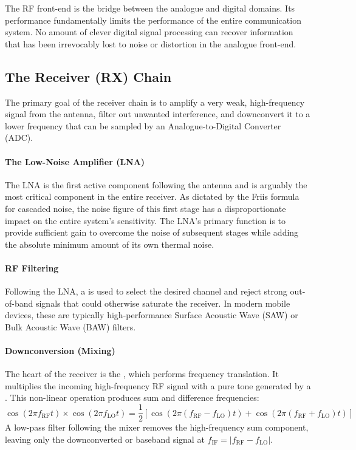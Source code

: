 \begin{keyconcept}
    The RF front-end is the bridge between the analogue and digital domains. Its performance fundamentally limits the performance of the entire communication system. No amount of clever digital signal processing can recover information that has been irrevocably lost to noise or distortion in the analogue front-end.
\end{keyconcept}

\subsection{The Receiver (RX) Chain}

The primary goal of the receiver chain is to amplify a very weak, high-frequency signal from the antenna, filter out unwanted interference, and downconvert it to a lower frequency that can be sampled by an Analogue-to-Digital Converter (ADC).

\paragraph{The Low-Noise Amplifier (LNA)}
The LNA is the first active component following the antenna and is arguably the most critical component in the entire receiver. As dictated by the Friis formula for cascaded noise, the noise figure of this first stage has a disproportionate impact on the entire system's sensitivity. The LNA's primary function is to provide sufficient gain to overcome the noise of subsequent stages while adding the absolute minimum amount of its own thermal noise.

\paragraph{RF Filtering}
Following the LNA, a  is used to select the desired channel and reject strong out-of-band signals that could otherwise saturate the receiver. In modern mobile devices, these are typically high-performance Surface Acoustic Wave (SAW) or Bulk Acoustic Wave (BAW) filters.

\paragraph{Downconversion (Mixing)}
The heart of the receiver is the , which performs frequency translation. It multiplies the incoming high-frequency RF signal with a pure tone generated by a . This non-linear operation produces sum and difference frequencies:
\begin{equation}
    \cos(2\pi f_{\text{RF}}t) \times \cos(2\pi f_{\text{LO}}t) = \frac{1}{2}\left[ \cos(2\pi(f_{\text{RF}}-f_{\text{LO}})t) + \cos(2\pi(f_{\text{RF}}+f_{\text{LO}})t) \right]
\end{equation}
A low-pass filter following the mixer removes the high-frequency sum component, leaving only the downconverted  or baseband signal at \(f_{\text{IF}} = |f_{\text{RF}} - f_{\text{LO}}|\).


